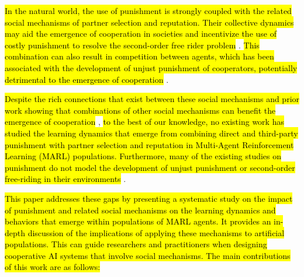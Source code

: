 \documentclass[sn-aps,numbered]{sn-jnl}%
\theoremstyle{thmstyleone}%
\theoremstyle{thmstyletwo}%
\theoremstyle{thmstylethree}%
\begin{document}
\hl{In the natural world, the use of punishment is strongly coupled with the related social mechanisms of partner selection and reputation. Their collective dynamics may aid the emergence of cooperation in societies and incentivize the use of costly punishment to resolve the second-order free rider problem} \citep{Raihani2015_tpp_rewarded_helpers, Redhead2021}. \hl{This combination can also result in competition between agents, which has been associated with the development of unjust punishment of cooperators, potentially detrimental to the emergence of cooperation} \citep{Pleasant2018}.

\hl{Despite the rich connections that exist between these social mechanisms and prior work showing that combinations of other social mechanisms can benefit the emergence of cooperation} \citep{parity_sympathy_reciprocity, punishment_coop_commitment, krellner2023words}, \hl{to the best of our knowledge, no existing work has studied the learning dynamics that emerge from combining direct and third-party punishment with partner selection and reputation in Multi-Agent Reinforcement Learning (MARL) populations. Furthermore, many of the existing studies on punishment do not model the development of unjust punishment or second-order free-riding in their environments} \citep{division_of_labour, stable_metapunish, Redhead2021, boyd1992punishment}.

\hl{This paper addresses these gaps by presenting a systematic study on the impact of punishment and related social mechanisms on the learning dynamics and behaviors that emerge within populations of MARL agents. It provides an in-depth discussion of the implications of applying these mechanisms to artificial populations. This can guide researchers and practitioners when designing cooperative AI systems that involve social mechanisms. The main contributions of this work are as follows:}
\end{document}
